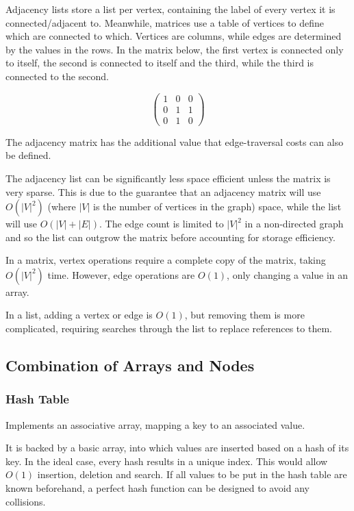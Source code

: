 \documentclass[]{article}
\begin{document}
Adjacency lists store a list per vertex, containing the label of every vertex it is connected/adjacent to. Meanwhile, matrices use a table of vertices to define which are connected to which. Vertices are columns, while edges are determined by the values in the rows. In the matrix below, the first vertex is connected only to itself, the second is connected to itself and the third, while the third is connected to the second.

\[ \left( \begin{array}{ccc}
1 & 0 & 0 \\
0 & 1 & 1 \\
0 & 1 & 0 \end{array} \right)\] 

The adjacency matrix has the additional value that edge-traversal costs can also be defined.

The adjacency list can be significantly less space efficient unless the matrix is very sparse. This is due to the guarantee that an adjacency matrix will use $O(|V|^{2})$ (where $|V|$ is the number of vertices in the graph) space, while the list will use $O(|V| + |E|)$. The edge count is limited to $|V|^{2}$ in a non-directed graph and so the list can outgrow the matrix before accounting for storage efficiency.

In a matrix, vertex operations require a complete copy of the matrix, taking $O(|V|^{2})$ time. However, edge operations are $O(1)$, only changing a value in an array.

In a list, adding a vertex or edge is $O(1)$, but removing them is more complicated, requiring searches through the list to replace references to them.

\pagebreak

\subsection{Combination of Arrays and Nodes}

\subsubsection{Hash Table}

Implements an associative array, mapping a key to an associated value.

It is backed by a basic array, into which values are inserted based on a hash of its key. In the ideal case, every hash results in a unique index. This would allow $O(1)$ insertion, deletion and search. If all values to be put in the hash table are known beforehand, a perfect hash function can be designed to avoid any collisions.
\end{document}

